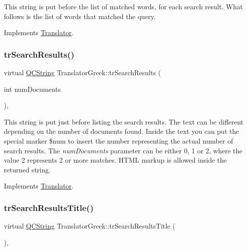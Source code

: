 This string is put before the list of matched words, for each search result. What follows is the list of words that matched the query. 

Implements \mbox{\hyperlink{class_translator}{Translator}}.

\mbox{\label{class_translator_greek_abaaed403a2ffb2b088276daf6984e468}} 
\subsubsection{\texorpdfstring{trSearchResults()}{trSearchResults()}}
{\footnotesize\ttfamily virtual \mbox{\hyperlink{class_q_c_string}{Q\+C\+String}} Translator\+Greek\+::tr\+Search\+Results (\begin{DoxyParamCaption}\item[{int}]{num\+Documents }\end{DoxyParamCaption})\hspace{0.3cm}{\ttfamily [inline]}, {\ttfamily [virtual]}}

This string is put just before listing the search results. The text can be different depending on the number of documents found. Inside the text you can put the special marker \$num to insert the number representing the actual number of search results. The {\itshape num\+Documents} parameter can be either 0, 1 or 2, where the value 2 represents 2 or more matches. H\+T\+ML markup is allowed inside the returned string. 

Implements \mbox{\hyperlink{class_translator}{Translator}}.

\mbox{\label{class_translator_greek_ad18014591c79c8e61748f7bec954a8ac}} 
\subsubsection{\texorpdfstring{trSearchResultsTitle()}{trSearchResultsTitle()}}
{\footnotesize\ttfamily virtual \mbox{\hyperlink{class_q_c_string}{Q\+C\+String}} Translator\+Greek\+::tr\+Search\+Results\+Title (\begin{DoxyParamCaption}{ }\end{DoxyParamCaption})\hspace{0.3cm}{\ttfamily [inline]}, {\ttfamily [virtual]}}

